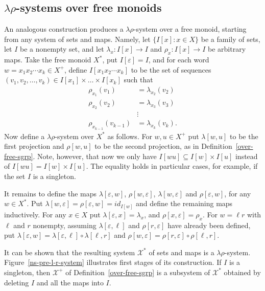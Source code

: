 \documentclass{amsart}
\begin{document}
\subsection{$\lambda\rho$-systems over free monoids}\label{free-constr}
An analogous construction produces a $\lambda\rho$-system
over a free monoid, starting from any system of sets and
maps. Namely, let $\{I[x]:x\in X\}$ be a family of sets, 
let $I$ be a nonempty set, and let $\lambda_x\colon I[x]\to I$ and 
$\rho_x\colon I[x]\to I$ be arbitrary maps. 
Take the free monoid $X^*$, put $I[\varepsilon] = I$, and for each word
$w = x_1x_2\cdots x_k\in X^+$, define $I[{x_1x_2\cdots x_k}]$ to be the set of sequences
$(v_1,v_2,\dots,v_k)\in I[{x_1}] \times \dots \times I[{x_k}]$ such that
\begin{align*}  
  \rho_{x_1}(v_1) &= \lambda_{x_2}(v_2) \\
\rho_{x_2}(v_2) &= \lambda_{x_3}(v_3) \\
 & \vdots  \\
\rho_{x_{k-1}}(v_{k-1}) &= \lambda_{x_k}(v_k). 
\end{align*}
Now define a $\lambda\rho$-system over $X^*$ as follows.
For $w,u\in X^+$ put $\lambda[w,u]$ to be the first projection and
$\rho[w,u]$ to be the second projection, as in Definition~\ref{over-free-sgrp}.
Note, however, that now we only have $I[wu]\subseteq I[w]\times
I[u]$ instead of $I[wu] = I[w]\times I[u]$. The equality holds in particular
cases, for example, if the set $I$ is a singleton.    

It remains to define the maps
$\lambda[\varepsilon, w]$, $\rho[w,\varepsilon]$,
$\lambda[w, \varepsilon]$ and $\rho[\varepsilon, w]$, for any $w\in X^*$.
Put 
$\lambda[w,\varepsilon] = \rho[\varepsilon,w] = id_{I[w]}$
and define the remaining maps inductively. For any $x\in X$ put 
$\lambda[\varepsilon,x] = \lambda_x$, and
$\rho[x,\varepsilon] = \rho_x$.
For $w = \ell r$ with $\ell$ and $r$ nonempty, assuming
$\lambda[\varepsilon,\ell]$ and $\rho[r,\varepsilon]$ have already been defined, 
put $\lambda[\varepsilon,w] =
\lambda[\varepsilon,\ell]\circ\lambda[\ell,r]$
and $\rho[w,\varepsilon] =
\rho[r,\varepsilon]\circ\rho[\ell,r]$.

It can be shown that the resulting system $\mathcal{X}^*$ of sets and maps is
a $\lambda\rho$-system. Figure~\ref{ns-pre-l-r-system} 
illustrates first stages of its construction. If $I$ is a singleton,
then $\mathcal{X}^+$ of Definition~\ref{over-free-sgrp} is a subsystem of
$\mathcal{X}^*$ obtained by deleting $I$ and all the maps into $I$.
\end{document}

